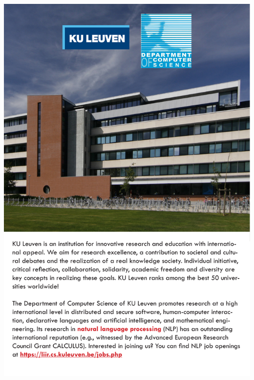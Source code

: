\thispagestyle{empty}
\begin{center}
  \vfill
  \includegraphics[width=\textwidth]{content/ads/full/kuleuven.pdf}
  \vfill
\end{center}

\clearpage
